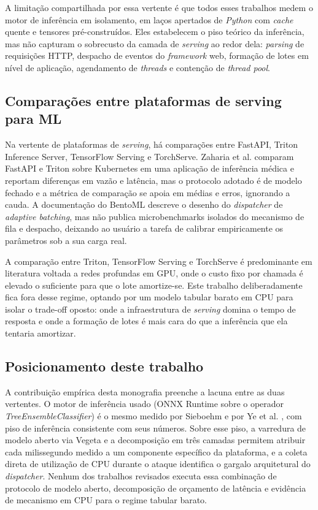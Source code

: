 A limitação compartilhada por essa vertente é que todos esses trabalhos
medem o motor de inferência em isolamento, em laços apertados de
\textit{Python} com \textit{cache} quente e tensores pré-construídos. Eles
estabelecem o piso teórico da inferência, mas não capturam o sobrecusto da
camada de \textit{serving} ao redor dela: \textit{parsing} de requisições
HTTP, despacho de eventos do \textit{framework} web, formação de lotes em
nível de aplicação, agendamento de \textit{threads} e contenção de
\textit{thread pool}.

\subsection{Comparações entre plataformas de serving para ML}

Na vertente de plataformas de \textit{serving}, há comparações entre FastAPI,
Triton Inference Server, TensorFlow Serving e TorchServe. Zaharia et al.
\cite{zaharia2024} comparam FastAPI e Triton sobre Kubernetes em uma
aplicação de inferência médica e reportam diferenças em vazão e latência,
mas o protocolo adotado é de modelo fechado e a métrica de comparação se
apoia em médias e erros, ignorando a cauda. A documentação do BentoML
\cite{bentoml_dispatcher} descreve o desenho do \textit{dispatcher} de
\textit{adaptive batching}, mas não publica microbenchmarks isolados do
mecanismo de fila e despacho, deixando ao usuário a tarefa de calibrar
empiricamente os parâmetros sob a sua carga real.

A comparação entre Triton, TensorFlow Serving e TorchServe é predominante
em literatura voltada a redes profundas em GPU, onde o custo fixo por
chamada é elevado o suficiente para que o lote amortize-se. Este trabalho
deliberadamente fica fora desse regime, optando por um modelo tabular barato
em CPU para isolar o trade-off oposto: onde a infraestrutura de \textit{serving}
domina o tempo de resposta e onde a formação de lotes é mais cara do que a
inferência que ela tentaria amortizar.

\subsection{Posicionamento deste trabalho}

A contribuição empírica desta monografia preenche a lacuna entre as duas
vertentes. O motor de inferência usado (ONNX Runtime sobre o operador
\textit{TreeEnsembleClassifier}) é o mesmo medido por Sieboehm
\cite{sieboehm2021} e por Ye et al. \cite{asadi2024}, com piso de
inferência consistente com seus números. Sobre esse piso, a varredura de
modelo aberto via Vegeta \cite{vegeta2024} e a decomposição em três camadas
permitem atribuir cada milissegundo medido a um componente específico da
plataforma, e a coleta direta de utilização de CPU durante o ataque identifica
o gargalo arquitetural do \textit{dispatcher}. Nenhum dos trabalhos
revisados executa essa combinação de protocolo de modelo aberto, decomposição
de orçamento de latência e evidência de mecanismo em CPU para o regime
tabular barato.

